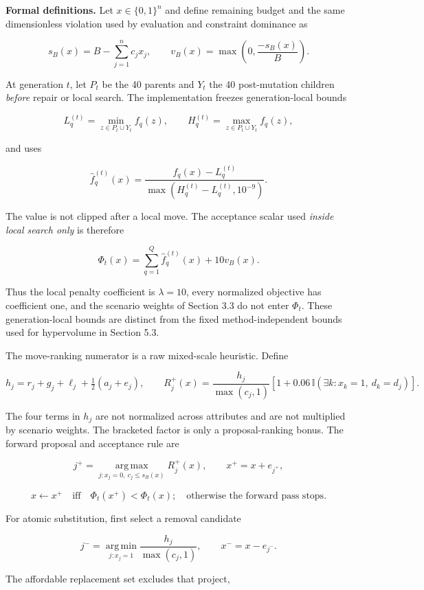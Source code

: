 \documentclass[
]{article}
\begin{document}
\textbf{Formal definitions.} Let \(x\in\{0,1\}^{n}\) and define remaining budget and the same dimensionless violation used by evaluation and constraint dominance as

\[
s_B(x)=B-\sum_{j=1}^{n}c_jx_j,\qquad
v_B(x)=\max\!\left(0,\frac{-s_B(x)}{B}\right).
\]

At generation \(t\), let \(P_t\) be the 40 parents and \(Y_t\) the 40 post-mutation children \emph{before} repair or local search. The implementation freezes generation-local bounds

\[
L_q^{(t)}=\min_{z\in P_t\cup Y_t} f_q(z),\qquad
H_q^{(t)}=\max_{z\in P_t\cup Y_t} f_q(z),
\]

and uses

\[
\hat f_q^{(t)}(x)=
\frac{f_q(x)-L_q^{(t)}}{\max\!\left(H_q^{(t)}-L_q^{(t)},10^{-9}\right)}.
\]

The value is not clipped after a local move. The acceptance scalar used \emph{inside local search only} is therefore

\[
\Phi_t(x)=\sum_{q=1}^{Q}\hat f_q^{(t)}(x)+10v_B(x).
\]

Thus the local penalty coefficient is \(\lambda=10\), every normalized objective has coefficient one, and the scenario weights of Section 3.3 do not enter \(\Phi_t\). These generation-local bounds are distinct from the fixed method-independent bounds used for hypervolume in Section 5.3.

The move-ranking numerator is a raw mixed-scale heuristic. Define

\[
h_j=r_j+g_j+\ell_j+\tfrac12(a_j+e_j),\qquad
R_j^{+}(x)=\frac{h_j}{\max(c_j,1)}
\left[1+0.06\,\mathbb I\!\left(\exists k:x_k=1,\ d_k=d_j\right)\right].
\]

The four terms in \(h_j\) are not normalized across attributes and are not multiplied by scenario weights. The bracketed factor is only a proposal-ranking bonus. The forward proposal and acceptance rule are

\[
j^+=\operatorname*{arg\,max}_{j:x_j=0,\ c_j\leq s_B(x)}R_j^+(x),
\qquad x^+=x+e_{j^+},
\]

\[
x\leftarrow x^+\quad\text{iff}\quad \Phi_t(x^+)<\Phi_t(x);
\quad\text{otherwise the forward pass stops.}
\]

For atomic substitution, first select a removal candidate

\[
j^-=\operatorname*{arg\,min}_{j:x_j=1}
\frac{h_j}{\max(c_j,1)},\qquad x^-=x-e_{j^-}.
\]

The affordable replacement set excludes that project,
\end{document}
